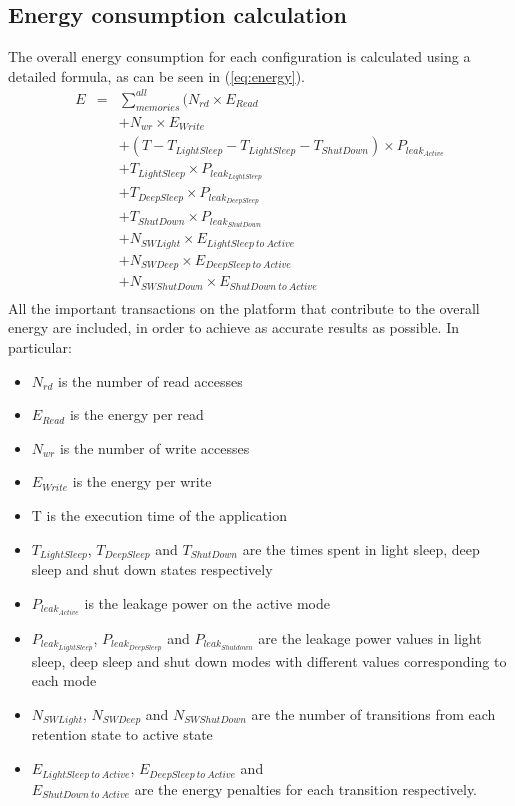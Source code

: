 \documentclass{acm_proc_article-sp}
\begin{document}
\subsection{Energy consumption calculation}
The overall energy consumption for each configuration is calculated using a detailed formula, as can be seen in (\ref{eq:energy}). 
\setlength{\arraycolsep}{0.0em}
\begin{eqnarray}
\label{eq:energy}
 E &{}= {}&\sum\limits_{memories}^{all}  ( N_{rd} \times E_{Read} \nonumber\\
		&&+ N_{wr} \times E_{Write} \nonumber\\
		&&+ (T - T_{LightSleep} - T_{LightSleep} - T_{ShutDown}) \times P_{leak_{Active}} \nonumber\\
		&&+ T_{LightSleep} \times P_{leak_{LightSleep}} \nonumber\\
		&&+ T_{DeepSleep} \times P_{leak_{DeepSleep}} \nonumber\\
		&&+ T_{ShutDown} \times P_{leak_{ShutDown}} \nonumber\\ 
		&& + N_{SWLight} \times E_{LightSleep \: to \: Active} \nonumber\\
		&& + N_{SWDeep} \times E_{DeepSleep \: to \: Active} \nonumber\\
		&& + N_{SWShutDown} \times E_{ShutDown \: to \: Active} \nonumber\\
\end{eqnarray}
\setlength{\arraycolsep}{5pt}
All the important transactions on the platform that contribute to the overall energy are included, in order to achieve as accurate results as possible. In particular:
\begin{itemize}
\item $N_{rd}$ is the number of read accesses
\item $E_{Read}$ is the energy per read
\item $N_{wr}$ is the number of write accesses 
\item $E_{Write}$ is the energy per write 
\item T is the execution time of the application
\item $T_{LightSleep}$, $T_{DeepSleep}$ and $T_{ShutDown}$ are the times spent in light sleep, deep sleep and shut down states respectively
\item $P_{leak_{Active}}$ is the leakage power on the active mode 
\item $P_{leak_{LightSleep}}$, $P_{leak_{DeepSleep}}$ and $P_{leak_{Shutdown}}$ are the leakage power values in light sleep, deep sleep and shut down modes with different values corresponding to each mode 
\item $N_{SWLight}$, $N_{SWDeep}$ and $N_{SWShutDown}$ are the number of transitions from each retention state to active state
\item $E_{LightSleep \: to \: Active}$, $E_{DeepSleep \: to \: Active}$ and \\ $E_{ShutDown \: to \: Active}$  are the energy penalties for each transition respectively.
\end{itemize}
\end{document}
